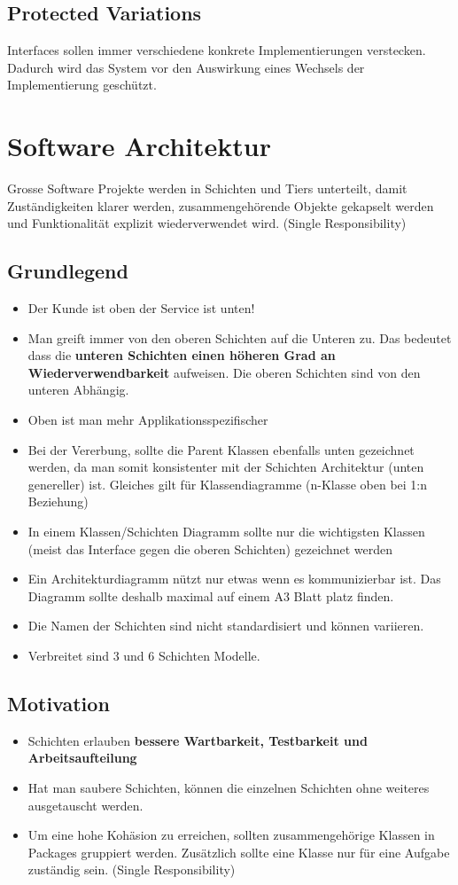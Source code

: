 \subsection{Protected Variations}
Interfaces sollen immer verschiedene konkrete Implementierungen verstecken. Dadurch wird das System vor den Auswirkung eines Wechsels der Implementierung geschützt.

\section{Software Architektur}
Grosse Software Projekte werden in Schichten und Tiers unterteilt, damit Zuständigkeiten klarer werden, zusammengehörende Objekte gekapselt werden und Funktionalität explizit wiederverwendet wird. (Single Responsibility)

\subsection{Grundlegend}
\begin{itemize}
	\item Der Kunde ist oben der Service ist unten!
	\item Man greift immer von den oberen Schichten auf die Unteren zu. Das bedeutet dass die \textbf{unteren Schichten einen höheren Grad an Wiederverwendbarkeit} aufweisen. Die oberen Schichten sind von den unteren Abhängig.
	\item Oben ist man mehr Applikationsspezifischer
	\item Bei der Vererbung, sollte die Parent Klassen ebenfalls unten gezeichnet werden, da man somit konsistenter mit der Schichten Architektur (unten genereller) ist. Gleiches gilt für Klassendiagramme (n-Klasse oben bei 1:n Beziehung)
	\item In einem Klassen/Schichten Diagramm sollte nur die wichtigsten Klassen (meist das Interface gegen die oberen Schichten) gezeichnet werden
	\item Ein Architekturdiagramm nützt nur etwas wenn es kommunizierbar ist. Das Diagramm sollte deshalb maximal auf einem A3 Blatt platz finden.
	\item Die Namen der Schichten sind nicht standardisiert und können variieren.
	\item Verbreitet sind 3 und 6 Schichten Modelle.
\end{itemize}

\subsection{Motivation}
\begin{itemize}
	\item Schichten erlauben \textbf{bessere Wartbarkeit, Testbarkeit und Arbeitsaufteilung}
	\item Hat man saubere Schichten, können die einzelnen Schichten ohne weiteres ausgetauscht werden.
	\item Um eine hohe Kohäsion zu erreichen, sollten zusammengehörige Klassen in Packages gruppiert werden. Zusätzlich sollte eine Klasse nur für eine Aufgabe zuständig sein. (Single Responsibility)
\end{itemize}

